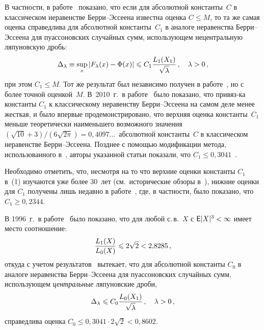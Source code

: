 \begin{multicols}{2}
В частности, в работе~\cite{Michel1993} показано, что если для
абсолютной константы~$C$ в классическом неравенстве Берри--Эссеена
известна оценка $C\leqslant M$, то та же самая оценка справедлива для
абсолютной константы~$C_1$ в аналоге неравенства Берри--Эссеена для
пуассоновских случайных сумм, использующем нецентральную ляпуновскую
дробь:
\begin{equation}
\Delta_\lambda\equiv \sup\limits_x|F_\lambda(x)-\Phi(x)|\leqslant
C_1\displaystyle\frac{\displaystyle L_1(X_1)\mathstrut}{\displaystyle \sqrt{\lambda}\mathstrut}\,,\quad \lambda>0\,,
\end{equation}
при этом $C_1\leqslant M$. Тот же результат был независимо получен в
работе~\cite{KorolevShorgin1997}, но с более точной оценкой~$M$. В~2010~г.\ 
в работе~\cite{KorolevShevtsova2010DAN} было показано, что
привяз-\linebreak ка константы $C_1$ к классическому неравенству Бер\-ри--Эс\-се\-ена
на самом деле менее жесткая, и было впервые продемонстрировано, что
верхняя оценка константы~$C_1$ меньше теоретически наименьшего
возможного значения $(\sqrt{10}+3)/(6\sqrt{2\pi})=0{,}4097\ldots$\
абсолютной константы~$C$ в классическом неравенстве Бер\-ри--Эссеена.
Позднее с помощью модификации метода, использованного
в~\cite{KorolevShevtsova2010DAN}, авторы указанной статьи показали,
что $C_1\leqslant0{,}3041$~\cite{KorolevShevtsova2010OPPM, KorolevShevtsova2010SAJ}.

Необходимо отметить, что, несмотря на то что верхние оценки константы
$C_1$ в~(1) изучаются уже более 30~лет (см.\ исторические обзоры
в~\cite{KorolevShevtsova2010OPPM, KorolevShevtsova2010SAJ}), нижние
оценки для $C_1$ получены лишь недавно в
работе~\cite{NefedovaShevtsova2010}, где, в частности, было показано,
что $C_1\geqslant0{,}2344$.

В 1996~г.\ в работе~\cite{Shorgin1996} было показано, что для любой
с.\,в.~$X$ с ${\sf E}|X|^3<\infty$ имеет место соотношение:
\begin{equation*}
\displaystyle\frac{\displaystyle L_1(X)\mathstrut}{\displaystyle L_0(X)\mathstrut}\leqslant 2\sqrt{2}<2{,}8285\,,
\end{equation*}
откуда с учетом результатов~\cite{KorolevShevtsova2010OPPM, KorolevShevtsova2010SAJ} 
вытекает, что для абсолютной константы $C_0$
в аналоге неравенства Берри--Эссеена для пуассоновских случайных
сумм, использующем {\it центральные} ляпуновские дроби,
\begin{equation}
\Delta_\lambda \leqslant C_0\displaystyle\frac{\displaystyle L_0(X_1)\mathstrut}{\displaystyle \sqrt{\lambda}\mathstrut}\,,\quad \lambda>0\,,
\end{equation}
справедлива оценка $C_0\leqslant 0{,}3041\cdot2\sqrt{2}<0{,}8602$.


\end{multicols}
